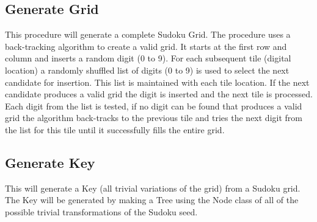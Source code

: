 \documentclass[fleqn]{article}
\begin{document}


\subsection{Generate Grid}
This procedure will generate a complete Sudoku Grid.
The procedure uses a back-tracking algorithm to create a valid grid. It starts at the first row and column and inserts a random digit (0 to 9). For each subsequent tile (digital location) a randomly shuffled list of digits (0 to 9) is used to select the next candidate for insertion. This list is maintained with each tile location. If the next candidate produces a valid grid the digit is inserted and the next tile is processed. Each digit from the list is tested, if no digit can be found that produces a valid grid the algorithm back-tracks to the previous tile and tries the next digit from the list for this tile until it successfully fills the entire grid. 

\subsection{Generate Key}
This will generate a Key (all trivial variations of the grid) from a Sudoku grid. The Key will be generated by making a Tree using the Node class of all of the possible trivial transformations of the Sudoku seed.
\end{document}
